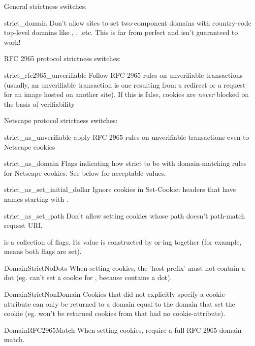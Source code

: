 General strictness switches:

\begin{memberdesc}[DefaultCookiePolicy]{strict_domain}
Don't allow sites to set two-component domains with country-code
top-level domains like , ,
.etc.  This is far from perfect and isn't guaranteed to
work!
\end{memberdesc}

RFC 2965 protocol strictness switches:

\begin{memberdesc}[DefaultCookiePolicy]{strict_rfc2965_unverifiable}
Follow RFC 2965 rules on unverifiable transactions (usually, an
unverifiable transaction is one resulting from a redirect or a request
for an image hosted on another site).  If this is false, cookies are
\emph{never} blocked on the basis of verifiability
\end{memberdesc}

Netscape protocol strictness switches:

\begin{memberdesc}[DefaultCookiePolicy]{strict_ns_unverifiable}
apply RFC 2965 rules on unverifiable transactions even to Netscape
cookies
\end{memberdesc}
\begin{memberdesc}[DefaultCookiePolicy]{strict_ns_domain}
Flags indicating how strict to be with domain-matching rules for
Netscape cookies.  See below for acceptable values.
\end{memberdesc}
\begin{memberdesc}[DefaultCookiePolicy]{strict_ns_set_initial_dollar}
Ignore cookies in Set-Cookie: headers that have names starting with
.
\end{memberdesc}
\begin{memberdesc}[DefaultCookiePolicy]{strict_ns_set_path}
Don't allow setting cookies whose path doesn't path-match request URI.
\end{memberdesc}

 is a collection of flags.  Its value is
constructed by or-ing together (for example,
 means both flags are
set).

\begin{memberdesc}[DefaultCookiePolicy]{DomainStrictNoDots}
When setting cookies, the 'host prefix' must not contain a dot
(eg.  can't set a cookie for ,
because  contains a dot).
\end{memberdesc}
\begin{memberdesc}[DefaultCookiePolicy]{DomainStrictNonDomain}
Cookies that did not explicitly specify a 
cookie-attribute can only be returned to a domain equal to the domain
that set the cookie (eg.  won't be returned
cookies from  that had no 
cookie-attribute).
\end{memberdesc}
\begin{memberdesc}[DefaultCookiePolicy]{DomainRFC2965Match}
When setting cookies, require a full RFC 2965 domain-match.
\end{memberdesc}

